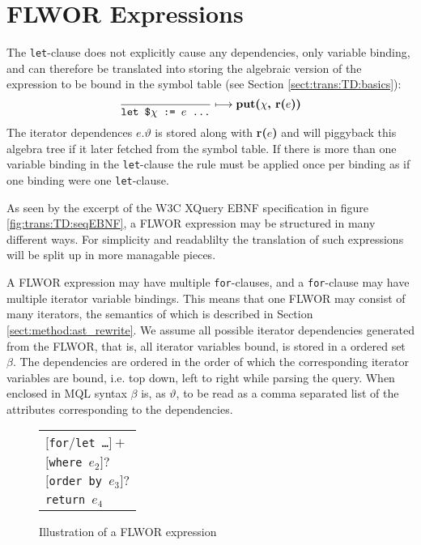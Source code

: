 \section{FLWOR Expressions}
\label{sect:trans:TD:simpleFLWOR}
The \texttt{let}-clause does not explicitly cause any dependencies, only
variable binding, and can therefore be translated into storing the algebraic version of the expression to be bound in
the symbol table (see Section \ref{sect:trans:TD:basics}):
\begin{equation}
\frac{}{\mbox{\texttt{let \$}}\chi \mbox{\texttt{ := }}e \mbox{\texttt{ \ldots}}}\longmapsto
\mbox{\textbf{put(}}\chi\mbox{\textbf{, r(}}e\mbox{\textbf{))}}
\label{rule:trans:TD:letbind}
\end{equation}
The iterator dependences $e.\vartheta$ is stored along with \textbf{r(}$e$\textbf{)} and will piggyback this
algebra tree if it later fetched from the symbol table. If there is more than one variable binding in the
\texttt{let}-clause the rule must be applied once per binding as if one binding
were one \texttt{let}-clause.

As seen by the excerpt of the W3C XQuery EBNF specification in figure
\ref{fig:trans:TD:seqEBNF}, a FLWOR expression may be structured in many
different ways. For simplicity and readablilty the translation of such
expressions will be split up in more managable pieces.

A FLWOR expression may have multiple \texttt{for}-clauses, and a \texttt{for}-clause may have multiple iterator
variable bindings. This means that one FLWOR may consist of many iterators, the semantics of which is described in
Section \ref{sect:method:ast_rewrite}. We assume all possible iterator dependencies generated from the FLWOR, that
is, all iterator variables bound, is stored in a ordered set $\beta$. The dependencies are ordered in the order of
which the corresponding iterator variables are bound, i.e. top down, left to right while parsing the query. When
enclosed in MQL syntax $\beta$ is, as $\vartheta$, to be read as a comma separated list of the attributes
corresponding to the dependencies.

\begin{figure}[h]
\centering
\begin{tabular}{l}
$[$\texttt{for}/\texttt{let \ldots}$]+$ \\ \quad
$[$\texttt{where }$e_2]?$ \\ \quad
$[$\texttt{order by }$e_3]?$ \\
\texttt{return }$e_4$
\end{tabular}

\caption{Illustration of a FLWOR expression \label{fig:trans:TD:flworIll}}
\end{figure}

